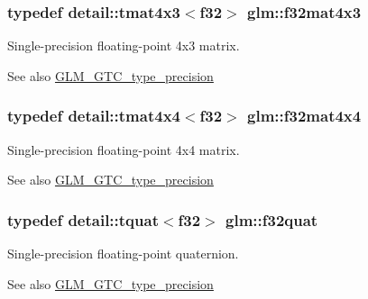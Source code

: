 \subsubsection[{f32mat4x3}]{\setlength{\rightskip}{0pt plus 5cm}typedef detail\+::tmat4x3$<$f32$>$ {\bf glm\+::f32mat4x3}}\label{group__gtc__type__precision_ga0b80103fc9c41a559c616e3f84dc570f}
Single-\/precision floating-\/point 4x3 matrix. \begin{DoxySeeAlso}{See also}
\hyperlink{group__gtc__type__precision}{G\+L\+M\+\_\+\+G\+T\+C\+\_\+type\+\_\+precision} 
\end{DoxySeeAlso}
\hypertarget{group__gtc__type__precision_gaffefd599ebe609080b8e999aa8df7f83}{}
\subsubsection[{f32mat4x4}]{\setlength{\rightskip}{0pt plus 5cm}typedef detail\+::tmat4x4$<$f32$>$ {\bf glm\+::f32mat4x4}}\label{group__gtc__type__precision_gaffefd599ebe609080b8e999aa8df7f83}
Single-\/precision floating-\/point 4x4 matrix. \begin{DoxySeeAlso}{See also}
\hyperlink{group__gtc__type__precision}{G\+L\+M\+\_\+\+G\+T\+C\+\_\+type\+\_\+precision} 
\end{DoxySeeAlso}
\hypertarget{group__gtc__type__precision_ga7edc623b0da433e074936e732600766f}{}
\subsubsection[{f32quat}]{\setlength{\rightskip}{0pt plus 5cm}typedef detail\+::tquat$<$f32$>$ {\bf glm\+::f32quat}}\label{group__gtc__type__precision_ga7edc623b0da433e074936e732600766f}
Single-\/precision floating-\/point quaternion. \begin{DoxySeeAlso}{See also}
\hyperlink{group__gtc__type__precision}{G\+L\+M\+\_\+\+G\+T\+C\+\_\+type\+\_\+precision} 
\end{DoxySeeAlso}
\hypertarget{group__gtc__type__precision_ga7cc1cb4f45d7274383e6f4ee7fd46f33}{}
